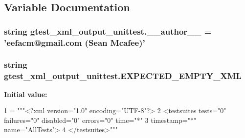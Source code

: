 \subsection{Variable Documentation}
\hypertarget{namespacegtest__xml__output__unittest_a14db59ae462df049de11ee863be54f09}{
\subsubsection[{\-\_\-\-\_\-author\-\_\-\-\_\-}]{\setlength{\rightskip}{0pt plus 5cm}string gtest\-\_\-xml\-\_\-output\-\_\-unittest.\-\_\-\-\_\-author\-\_\-\-\_\- = 'eefacm@gmail.\-com (Sean Mcafee)'}}\label{namespacegtest__xml__output__unittest_a14db59ae462df049de11ee863be54f09}
\hypertarget{namespacegtest__xml__output__unittest_abe1569d019b037f006986004349c7cf3}{
\subsubsection[{E\-X\-P\-E\-C\-T\-E\-D\-\_\-\-E\-M\-P\-T\-Y\-\_\-\-X\-M\-L}]{\setlength{\rightskip}{0pt plus 5cm}string gtest\-\_\-xml\-\_\-output\-\_\-unittest.\-E\-X\-P\-E\-C\-T\-E\-D\-\_\-\-E\-M\-P\-T\-Y\-\_\-\-X\-M\-L}}\label{namespacegtest__xml__output__unittest_abe1569d019b037f006986004349c7cf3}
{\bfseries Initial value\-:}
\begin{DoxyCode}
1 = \textcolor{stringliteral}{"""<?xml version="1.0" encoding="UTF-8"?>}
2 \textcolor{stringliteral}{<testsuites tests="0" failures="0" disabled="0" errors="0" time="*"}
3 \textcolor{stringliteral}{            timestamp="*" name="AllTests">}
4 \textcolor{stringliteral}{</testsuites>"""}
\end{DoxyCode}
